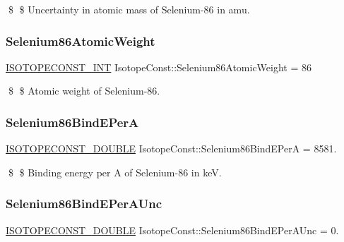 \$ \$ Uncertainty in atomic mass of Selenium-\/86 in amu. \mbox{\label{group___isotope_const-_selenium-_se86_gaa58d19483e46cbdb1a2f922f3bd879c5}} 
\subsubsection{\texorpdfstring{Selenium86\+Atomic\+Weight}{Selenium86AtomicWeight}}
{\footnotesize\ttfamily \mbox{\hyperlink{group___isotope_const-_macros_ga5f18360b3e99483a35c32d789e62621c}{I\+S\+O\+T\+O\+P\+E\+C\+O\+N\+S\+T\+\_\+\+I\+NT}} Isotope\+Const\+::\+Selenium86\+Atomic\+Weight = 86}

\$ \$ Atomic weight of Selenium-\/86. \mbox{\label{group___isotope_const-_selenium-_se86_ga75edf2154fc0d2d4f09e31cbb5a22bd2}} 
\subsubsection{\texorpdfstring{Selenium86\+Bind\+E\+PerA}{Selenium86BindEPerA}}
{\footnotesize\ttfamily \mbox{\hyperlink{group___isotope_const-_macros_ga8f45a7272ce02c0b4c65c44636ed719a}{I\+S\+O\+T\+O\+P\+E\+C\+O\+N\+S\+T\+\_\+\+D\+O\+U\+B\+LE}} Isotope\+Const\+::\+Selenium86\+Bind\+E\+PerA = 8581.}

\$ \$ Binding energy per A of Selenium-\/86 in keV. \mbox{\label{group___isotope_const-_selenium-_se86_ga88f4b77d95c8bab2defe8ccc88d1858a}} 
\subsubsection{\texorpdfstring{Selenium86\+Bind\+E\+Per\+A\+Unc}{Selenium86BindEPerAUnc}}
{\footnotesize\ttfamily \mbox{\hyperlink{group___isotope_const-_macros_ga8f45a7272ce02c0b4c65c44636ed719a}{I\+S\+O\+T\+O\+P\+E\+C\+O\+N\+S\+T\+\_\+\+D\+O\+U\+B\+LE}} Isotope\+Const\+::\+Selenium86\+Bind\+E\+Per\+A\+Unc = 0.}

